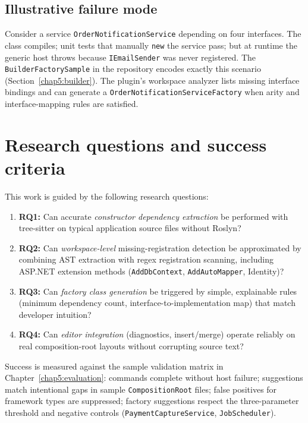 \subsection{Illustrative failure mode}

Consider a service \texttt{OrderNotificationService} depending on four interfaces. The class compiles; unit tests that manually \texttt{new} the service pass; but at runtime the generic host throws because \texttt{IEmailSender} was never registered. The \texttt{BuilderFactorySample} in the repository encodes exactly this scenario (Section~\ref{chap5:builder}). The plugin's workspace analyzer lists missing interface bindings and can generate a \texttt{OrderNotificationServiceFactory} when arity and interface-mapping rules are satisfied.

\section{Research questions and success criteria}
\label{chap1:research-questions}

This work is guided by the following research questions:
\begin{enumerate}
	\item \textbf{RQ1:} Can accurate \emph{constructor dependency extraction} be performed with tree-sitter on typical application source files without Roslyn?
	\item \textbf{RQ2:} Can \emph{workspace-level} missing-registration detection be approximated by combining AST extraction with regex registration scanning, including ASP.NET extension methods (\texttt{AddDbContext}, \texttt{AddAutoMapper}, Identity)?
	\item \textbf{RQ3:} Can \emph{factory class generation} be triggered by simple, explainable rules (minimum dependency count, interface-to-implementation map) that match developer intuition?
	\item \textbf{RQ4:} Can \emph{editor integration} (diagnostics, insert/merge) operate reliably on real composition-root layouts without corrupting source text?
\end{enumerate}

Success is measured against the sample validation matrix in Chapter~\ref{chap5:evaluation}: commands complete without host failure; suggestions match intentional gaps in sample \texttt{CompositionRoot} files; false positives for framework types are suppressed; factory suggestions respect the three-parameter threshold and negative controls (\texttt{PaymentCaptureService}, \texttt{JobScheduler}).


